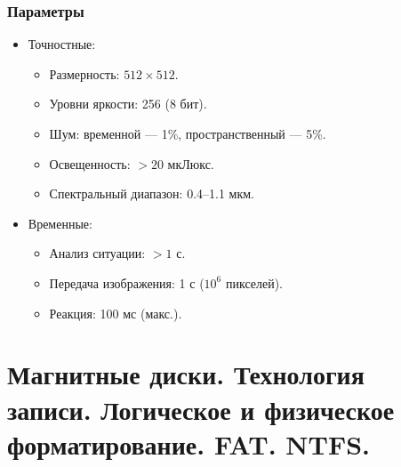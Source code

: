 	\subsubsection{Параметры}
	\begin{itemize}
		\item Точностные:
		\begin{itemize}
			\item Размерность: \( 512 \times 512 \).
			\item Уровни яркости: 256 (8 бит).
			\item Шум: временной — 1\%, пространственный — 5\%.
			\item Освещенность: \( > 20 \) мкЛюкс.
			\item Спектральный диапазон: 0.4–1.1 мкм.
		\end{itemize}
		\item Временные:
		\begin{itemize}
			\item Анализ ситуации: \( > 1 \) с.
			\item Передача изображения: 1 с (\( 10^6 \) пикселей).
			\item Реакция: 100 мс (макс.).
		\end{itemize}
	\end{itemize}
	
	\newpage
	
	\section{Магнитные диски.  Технология записи.  Логическое и физическое форматирование. FAT. NTFS.}
	
